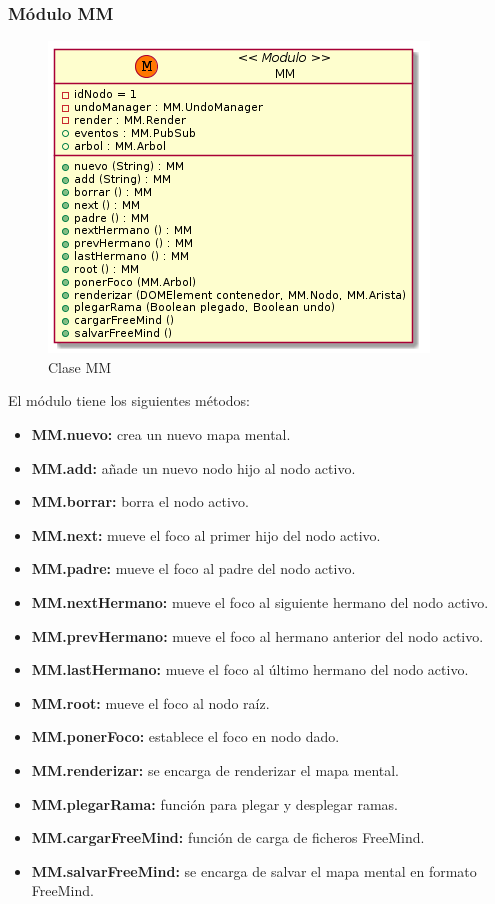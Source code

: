 \subsubsection{Módulo MM}

\begin{figure}[tbph]
\centering
\includegraphics[width=0.5\linewidth]{imagenes/diagrama-clase-mm}
\caption{Clase MM}
\label{fig:diagrama-clase-mm}
\end{figure}

El módulo tiene los siguientes métodos:
\begin{itemize}
\item \textbf{MM.nuevo:} crea un nuevo mapa mental.
\item \textbf{MM.add:} añade un nuevo nodo hijo al nodo activo.
\item \textbf{MM.borrar:} borra el nodo activo.
\item \textbf{MM.next:} mueve el foco al primer hijo del nodo activo.
\item \textbf{MM.padre:} mueve el foco al padre del nodo activo.
\item \textbf{MM.nextHermano:} mueve el foco al siguiente hermano del nodo activo.
\item \textbf{MM.prevHermano:} mueve el foco al hermano anterior del nodo activo.
\item \textbf{MM.lastHermano:} mueve el foco al último hermano del nodo activo.
\item \textbf{MM.root:} mueve el foco al nodo raíz.
\item \textbf{MM.ponerFoco:} establece el foco en nodo dado.
\item \textbf{MM.renderizar:} se encarga de renderizar el mapa mental.
\item \textbf{MM.plegarRama:} función para plegar y desplegar ramas.
\item \textbf{MM.cargarFreeMind:} función de carga de ficheros FreeMind.
\item \textbf{MM.salvarFreeMind:} se encarga de salvar el mapa mental en formato FreeMind.
\end{itemize}



